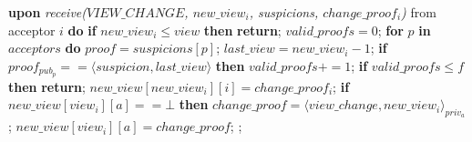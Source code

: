 \begin{algorithm}
\begin{algorithmic}[1]
		\State\textbf{upon} \textit{receive($VIEW\_CHANGE$, $new\_view_i$, suspicions, $change\_proof_i$)} from acceptor $i$ \textbf{do} 
		\State\hspace{\algorithmicindent} \textbf{if} $new\_view_i \leq view$ \textbf{then}
		\State\hspace{\algorithmicindent}\hspace{\algorithmicindent}\textbf{return};
		\State
		\State\hspace{\algorithmicindent} $valid\_proofs = 0$;
		\State\hspace{\algorithmicindent} \textbf{for} $p$ \textbf{in} $acceptors$ \textbf{do} 
		\State\hspace{\algorithmicindent}\hspace{\algorithmicindent} $proof = suspicions[p]$;
		\State\hspace{\algorithmicindent}\hspace{\algorithmicindent} $last\_view = new\_view_i-1$;
		\State\hspace{\algorithmicindent}\hspace{\algorithmicindent} \textbf{if} $proof_{pub_p} == \langle suspicion, last\_view \rangle$ \textbf{then}
		\State\hspace{\algorithmicindent}\hspace{\algorithmicindent}\hspace{\algorithmicindent} $valid\_proofs \mathrel{+{=}} 1$;
		\State
		\State\hspace{\algorithmicindent} \textbf{if} $valid\_proofs \leq f$ \textbf{then}
		\State\hspace{\algorithmicindent}\hspace{\algorithmicindent} \textbf{return};
		\State
		\State\hspace{\algorithmicindent} $new\_view[new\_view_i][i] = change\_proof_i$;
		\State\hspace{\algorithmicindent} \textbf{if} $new\_view[view_i][a] == \bot$ \textbf{then}				
		\State\hspace{\algorithmicindent}\hspace{\algorithmicindent} $change\_proof = \langle view\_change, new\_view_i \rangle_{priv_a}$;
		\State\hspace{\algorithmicindent}\hspace{\algorithmicindent} $new\_view[view_i][a] = change\_proof$;
		\State\hspace{\algorithmicindent}\hspace{\algorithmicindent}  ;

\end{algorithmic}
\end{algorithm}
